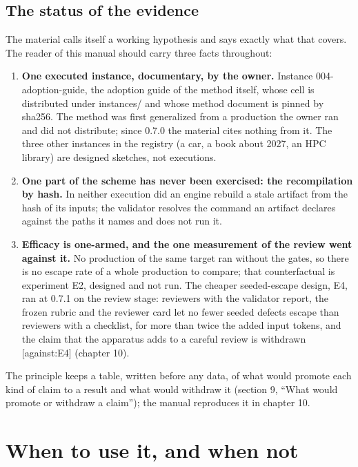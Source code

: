 \documentclass[
  american,
  10pt,
]{report}
\providecommand{\tightlist}{%
  \setlength{\itemsep}{0pt}\setlength{\parskip}{0pt}}
\renewcommand{\texttt}[1]{{\ttfamily\hyphenchar\font=-1 #1}}
\begin{document}
\section{The status of the evidence}\label{the-status-of-the-evidence}

The material calls itself a working hypothesis and says exactly what
that covers. The reader of this manual should carry three facts
throughout:

\begin{enumerate}
\def\labelenumi{\arabic{enumi}.}
\tightlist
\item
  \textbf{One executed instance, documentary, by the owner.} Instance
  \texttt{004-\allowbreak{}adoption-\allowbreak{}guide}, the adoption
  guide of the method itself, whose cell is distributed under
  \texttt{instances/\allowbreak{}} and whose method document is pinned
  by sha256. The method was first generalized from a production the
  owner ran and did not distribute; since 0.7.0 the material cites
  nothing from it. The three other instances in the registry (a car, a
  book about 2027, an HPC library) are designed sketches, not
  executions.
\item
  \textbf{One part of the scheme has never been exercised: the
  recompilation by hash.} In neither execution did an engine rebuild a
  stale artifact from the hash of its inputs; the validator resolves the
  command an artifact declares against the paths it names and does not
  run it.
\item
  \textbf{Efficacy is one-armed, and the one measurement of the review
  went against it.} No production of the same target ran without the
  gates, so there is no escape rate of a whole production to compare;
  that counterfactual is experiment E2, designed and not run. The
  cheaper seeded-escape design, E4, ran at 0.7.1 on the review stage:
  reviewers with the validator report, the frozen rubric and the
  reviewer card let no fewer seeded defects escape than reviewers with a
  checklist, for more than twice the added input tokens, and the claim
  that the apparatus adds to a careful review is withdrawn
  \texttt{[against:\allowbreak{}E4]} (chapter 10).
\end{enumerate}

The principle keeps a table, written before any data, of what would
promote each kind of claim to a result and what would withdraw it
(section 9, ``What would promote or withdraw a claim''); the manual
reproduces it in chapter 10.

\chapter{When to use it, and when
not}\label{when-to-use-it-and-when-not}
\end{document}
